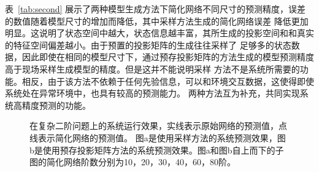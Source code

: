 表~\ref{tab:second} 展示了两种模型生成方法下简化网络不同尺寸的预测精度，误差的数值随着模型尺寸的增加而降低，其中采样方法生成的简化网络误差
降低更加明显。这说明了状态空间中越大，状态信息越丰富，其所生成的投影空间和和真实的特征空间偏差越小。由于预置的投影矩阵的生成往往采样了
足够多的状态数据，因此即使在相同的模型尺寸下，通过预存投影矩阵的方法生成的模型预测精度高于现场采样生成模型的精度。但是这并不能说明采样
方法不是系统所需要的功能。相反，由于该方法不依赖于任何先验信息，可以和环境交互数据，这使得即使系统处在异常环境中，也具有较高的预测能力。
两种方法互为补充，共同实现系统高精度预测的功能。
\begin{figure}
	\centering
	\caption{在复杂二阶问题上的系统运行效果，实线表示原始网络的预测值，点线表示简化网络的预测值。
		图a是使用采样方法的系统预测效果，图b是使用预存投影矩阵方法的系统预测效果。图a和图b自上而下的子图的简化网络阶数分别为10，20，30，40，60，80阶。}
	\label{fig:second}
\end{figure}


